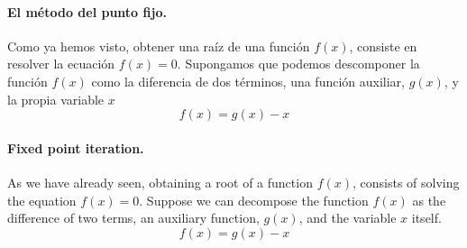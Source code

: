 \begin{paracol}{2}
\paragraph{El método del punto fijo.} Como ya hemos visto, obtener una raíz de una función $f(x)$, consiste en resolver la ecuación $f(x)=0$. Supongamos que podemos descomponer la función $f(x)$ como la diferencia de dos términos, una función auxiliar, $g(x)$, y la propia variable $x$
\begin{equation*}
f(x)=g(x)-x
\end{equation*}
\switchcolumn
\paragraph{Fixed point iteration.} As we have already seen, obtaining a root of a function $f(x)$, consists of solving the equation $f(x)=0$. Suppose we can decompose the function $f(x)$ as the difference of two terms, an auxiliary function, $g(x)$, and the variable $x$ itself.
\begin{equation*}
f(x)=g(x)-x
\end{equation*}

\end{paracol}


